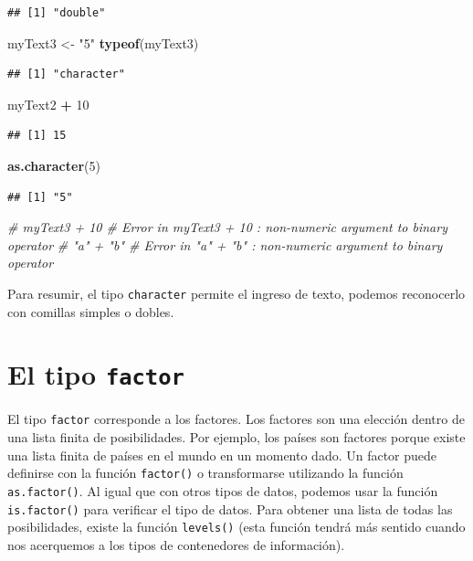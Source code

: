 \documentclass[]{book}
\newenvironment{Shaded}{\begin{snugshade}}{\end{snugshade}}
\newcommand{\KeywordTok}[1]{\textcolor[rgb]{0.13,0.29,0.53}{\textbf{#1}}}
\newcommand{\DecValTok}[1]{\textcolor[rgb]{0.00,0.00,0.81}{#1}}
\newcommand{\StringTok}[1]{\textcolor[rgb]{0.31,0.60,0.02}{#1}}
\newcommand{\CommentTok}[1]{\textcolor[rgb]{0.56,0.35,0.01}{\textit{#1}}}
\newcommand{\OperatorTok}[1]{\textcolor[rgb]{0.81,0.36,0.00}{\textbf{#1}}}
\newcommand{\NormalTok}[1]{#1}
\begin{document}
\begin{verbatim}
## [1] "double"
\end{verbatim}

\begin{Shaded}
\begin{Highlighting}[]
\NormalTok{myText3 <-}\StringTok{ "5"}
\KeywordTok{typeof}\NormalTok{(myText3)}
\end{Highlighting}
\end{Shaded}

\begin{verbatim}
## [1] "character"
\end{verbatim}

\begin{Shaded}
\begin{Highlighting}[]
\NormalTok{myText2 }\OperatorTok{+}\StringTok{ }\DecValTok{10}
\end{Highlighting}
\end{Shaded}

\begin{verbatim}
## [1] 15
\end{verbatim}

\begin{Shaded}
\begin{Highlighting}[]
\KeywordTok{as.character}\NormalTok{(}\DecValTok{5}\NormalTok{)}
\end{Highlighting}
\end{Shaded}

\begin{verbatim}
## [1] "5"
\end{verbatim}

\begin{Shaded}
\begin{Highlighting}[]
\CommentTok{# myText3 + 10 # Error in myText3 + 10 : non-numeric argument to binary operator}
\CommentTok{# "a" + "b" # Error in "a" + "b" : non-numeric argument to binary operator}
\end{Highlighting}
\end{Shaded}

Para resumir, el tipo \texttt{character} permite el ingreso de texto,
podemos reconocerlo con comillas simples o dobles.

\section{\texorpdfstring{El tipo
\texttt{factor}}{El tipo factor}}\label{el-tipo-factor}

El tipo \texttt{factor} corresponde a los factores. Los factores son una
elección dentro de una lista finita de posibilidades. Por ejemplo, los
países son factores porque existe una lista finita de países en el mundo
en un momento dado. Un factor puede definirse con la función
\texttt{factor()} o transformarse utilizando la función
\texttt{as.factor()}. Al igual que con otros tipos de datos, podemos
usar la función \texttt{is.factor()} para verificar el tipo de datos.
Para obtener una lista de todas las posibilidades, existe la función
\texttt{levels()} (esta función tendrá más sentido cuando nos acerquemos
a los tipos de contenedores de información).
\end{document}
